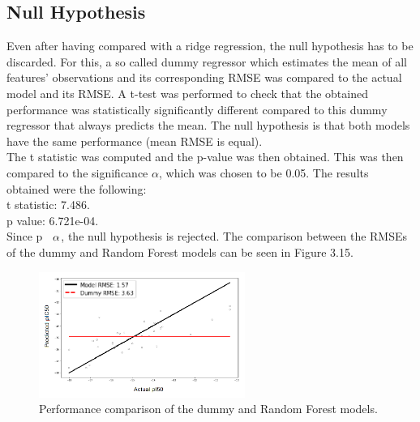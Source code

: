 \subsection{Null Hypothesis}
Even after having compared with a ridge regression, the null hypothesis has to be discarded. For this, a so called dummy regressor which estimates the mean of all features' observations and its corresponding RMSE was compared to the actual model and its RMSE. A t-test was performed to check that the obtained performance was statistically significantly different compared to this dummy regressor that always predicts the mean. The null hypothesis is that both models have the same performance (mean RMSE is equal).\\

The t statistic was computed and the p-value was then obtained. This was then compared to the significance $\alpha$, which was chosen to be 0.05. The results obtained were the following:\\
\textbullet\hspace{0.5cm} t statistic: 7.486.\\
\textbullet\hspace{0.5cm} p value: 6.721e-04.\\
Since p \ll $\hspace{0.2cm}\alpha$, the null hypothesis is rejected. The comparison between the RMSEs of the dummy and Random Forest models can be seen in Figure 3.15.
\begin{figure}[h]
    \centering
    \includegraphics[width=0.6\textwidth]{Images/Results/dummy.png}
    \caption{Performance comparison of the dummy and Random Forest models.}
\end{figure}


